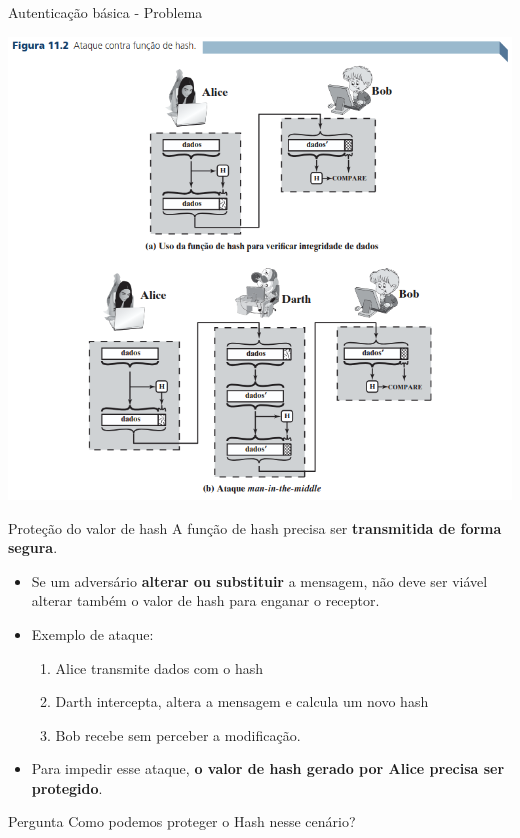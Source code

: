 \begin{frame}{Autenticação básica - Problema}

    \centering
    \includegraphics[width=0.6\linewidth]{Figuras/mitm-autenticacao-hash.png}


\end{frame}


\begin{frame}{Proteção do valor de hash}
    A função de hash precisa ser \textbf{transmitida de forma segura}.

    \medskip

    \begin{itemize}
        \item Se um adversário \textbf{alterar ou substituir} a mensagem, não deve ser viável alterar também o valor de hash para enganar o receptor.
        \item Exemplo de ataque:
              \begin{enumerate}
                  \item Alice transmite dados com o hash
                  \item Darth intercepta, altera a mensagem e calcula um novo hash
                  \item Bob recebe sem perceber a modificação.
              \end{enumerate}
        \item Para impedir esse ataque, \textbf{o valor de hash gerado por Alice precisa ser protegido}.
    \end{itemize}

    \begin{block}{Pergunta}
        Como podemos proteger o Hash nesse cenário?
    \end{block}
\end{frame}

